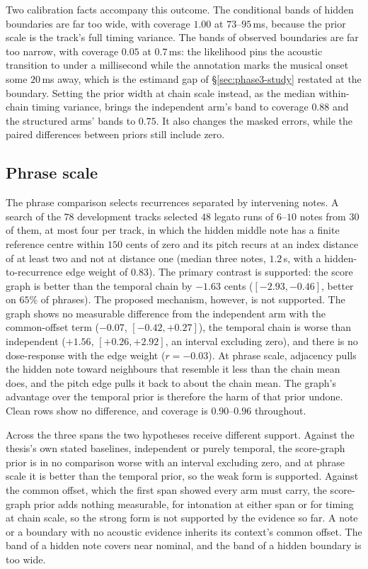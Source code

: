 \documentclass[11pt,a4paper]{report}
\begin{document}
Two calibration facts accompany this outcome. The conditional bands of
hidden boundaries are far too wide, with coverage $1.00$ at $73$--$95$\,ms, because the prior
scale is the track's full timing variance. The bands of observed boundaries are
far too narrow, with coverage $0.05$ at $0.7$\,ms: the likelihood pins the
acoustic transition to under a millisecond while the annotation marks the
musical onset some $20$\,ms away, which is the estimand gap of
\S\ref{sec:phase3-study} restated at the boundary. Setting the prior width
at chain scale instead, as the median within-chain timing variance, brings
the independent arm's band to coverage $0.88$ and the structured arms'
bands to $0.75$. It also changes the masked errors, while the paired
differences between priors still include zero.

\subsection{Phrase scale}

The phrase comparison selects recurrences separated by intervening notes.
A search of the $78$ development tracks selected $48$ legato runs of
$6$--$10$ notes from $30$ of them, at most four per track, in which the
hidden middle note has a finite reference centre within $150$ cents of zero
and its pitch recurs at an index distance of at least two and not at
distance one (median three notes, $1.2$\,s, with a
hidden-to-recurrence edge weight of $0.83$). The primary
contrast is supported: the score graph is better than the temporal chain
by $-1.63$ cents ($[-2.93, -0.46]$, better on $65\%$ of phrases). The
proposed mechanism, however, is not supported. The graph shows no
measurable difference from the independent arm with the common-offset term ($-0.07$,
$[-0.42, +0.27]$), the temporal chain is worse than independent ($+1.56$,
$[+0.26, +2.92]$, an interval excluding zero), and there is no
dose-response with the edge weight ($r=-0.03$). At phrase scale, adjacency
pulls the hidden note toward neighbours that resemble it less than the
chain mean does, and the pitch edge pulls it back to about the chain mean.
The graph's advantage over the temporal prior is therefore the harm of that
prior undone. Clean rows show no difference, and coverage is
$0.90$--$0.96$ throughout.

Across the three spans the two hypotheses receive different support.
Against the thesis's own stated baselines, independent or purely temporal,
the score-graph prior is in no comparison worse with an interval
excluding zero, and at phrase scale it is better than the temporal prior,
so the weak form is supported. Against the common offset, which the first
span showed every arm must carry, the score-graph prior adds nothing
measurable, for intonation at either span or for timing at
chain scale, so the strong form is not supported by the evidence so far.
A note or a boundary with no acoustic evidence inherits its context's
common offset. The band of a hidden note covers near nominal, and the band
of a hidden boundary is too wide.
\end{document}
